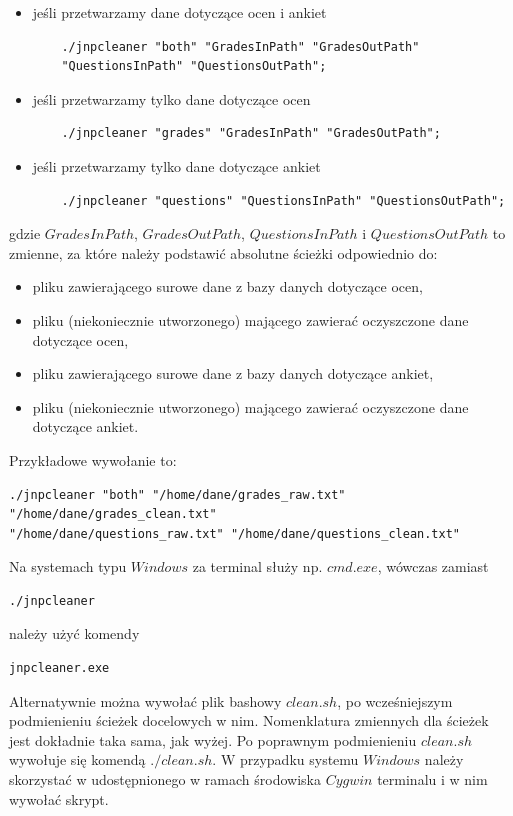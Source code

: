 \documentclass[]{article}
\begin{document}
\begin{itemize}
	\item jeśli przetwarzamy dane dotyczące ocen i ankiet
	\begin{verbatim}
	./jnpcleaner "both" "GradesInPath" "GradesOutPath"
	"QuestionsInPath" "QuestionsOutPath";
	\end{verbatim}
	\item jeśli przetwarzamy tylko dane dotyczące ocen
	\begin{verbatim}
	./jnpcleaner "grades" "GradesInPath" "GradesOutPath";
	\end{verbatim}
	\item jeśli przetwarzamy tylko dane dotyczące ankiet
	\begin{verbatim}
	./jnpcleaner "questions" "QuestionsInPath" "QuestionsOutPath";
	\end{verbatim}
\end{itemize}
gdzie $GradesInPath$, $GradesOutPath$, $QuestionsInPath$ i $QuestionsOutPath$ to zmienne, za które należy podstawić absolutne ścieżki odpowiednio do: 
\begin{itemize}
	\item pliku zawierającego surowe dane z bazy danych dotyczące ocen,
	\item pliku (niekoniecznie utworzonego) mającego zawierać oczyszczone dane dotyczące ocen,
	\item pliku zawierającego surowe dane z bazy danych dotyczące ankiet,
	\item pliku (niekoniecznie utworzonego) mającego zawierać oczyszczone dane dotyczące ankiet.
\end{itemize}

Przykładowe wywołanie to:
\begin{verbatim}
./jnpcleaner "both" "/home/dane/grades_raw.txt" "/home/dane/grades_clean.txt"
"/home/dane/questions_raw.txt" "/home/dane/questions_clean.txt"
\end{verbatim}

Na systemach typu $Windows$ za terminal służy np. $cmd.exe$, wówczas zamiast 
\begin{verbatim}
./jnpcleaner
\end{verbatim}
należy użyć komendy 
\begin{verbatim}
jnpcleaner.exe
\end{verbatim}

Alternatywnie można wywołać plik bashowy $clean.sh$, po wcześniejszym podmienieniu ścieżek docelowych w nim. Nomenklatura zmiennych dla ścieżek jest dokładnie taka sama, jak wyżej. Po poprawnym podmienieniu $clean.sh$ wywołuje się komendą $./clean.sh$. W przypadku systemu $Windows$ należy skorzystać w udostępnionego w ramach środowiska $Cygwin$ terminalu i w nim wywołać skrypt.
\end{document}
